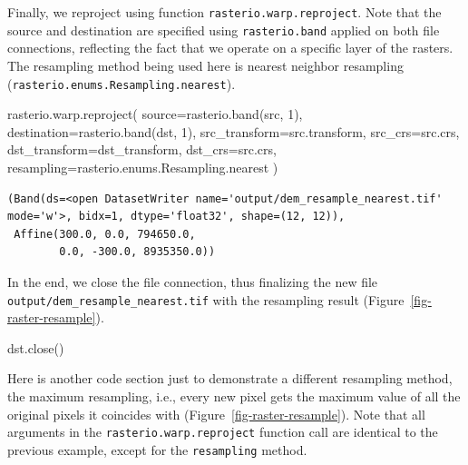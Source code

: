 \documentclass[
  letterpaper,
]{krantz}
\newenvironment{Shaded}{\begin{snugshade}}{\end{snugshade}}
\newcommand{\DecValTok}[1]{\textcolor[rgb]{0.68,0.00,0.00}{#1}}
\newcommand{\NormalTok}[1]{\textcolor[rgb]{0.00,0.23,0.31}{#1}}
\newcommand{\OperatorTok}[1]{\textcolor[rgb]{0.37,0.37,0.37}{#1}}
\begin{document}
Finally, we reproject using function \texttt{rasterio.warp.reproject}.
Note that the source and destination are specified using
\texttt{rasterio.band} applied on both file connections, reflecting the
fact that we operate on a specific layer of the rasters. The resampling
method being used here is nearest neighbor resampling
(\texttt{rasterio.enums.Resampling.nearest}).

\begin{Shaded}
\begin{Highlighting}[]
\NormalTok{rasterio.warp.reproject(}
\NormalTok{    source}\OperatorTok{=}\NormalTok{rasterio.band(src, }\DecValTok{1}\NormalTok{),}
\NormalTok{    destination}\OperatorTok{=}\NormalTok{rasterio.band(dst, }\DecValTok{1}\NormalTok{),}
\NormalTok{    src\_transform}\OperatorTok{=}\NormalTok{src.transform,}
\NormalTok{    src\_crs}\OperatorTok{=}\NormalTok{src.crs,}
\NormalTok{    dst\_transform}\OperatorTok{=}\NormalTok{dst\_transform,}
\NormalTok{    dst\_crs}\OperatorTok{=}\NormalTok{src.crs,}
\NormalTok{    resampling}\OperatorTok{=}\NormalTok{rasterio.enums.Resampling.nearest}
\NormalTok{)}
\end{Highlighting}
\end{Shaded}

\begin{verbatim}
(Band(ds=<open DatasetWriter name='output/dem_resample_nearest.tif' mode='w'>, bidx=1, dtype='float32', shape=(12, 12)),
 Affine(300.0, 0.0, 794650.0,
        0.0, -300.0, 8935350.0))
\end{verbatim}

In the end, we close the file connection, thus finalizing the new file
\texttt{output/dem\_resample\_nearest.tif} with the resampling result
(Figure~\ref{fig-raster-resample}).

\begin{Shaded}
\begin{Highlighting}[]
\NormalTok{dst.close()}
\end{Highlighting}
\end{Shaded}

Here is another code section just to demonstrate a different resampling
method, the maximum resampling, i.e., every new pixel gets the maximum
value of all the original pixels it coincides with
(Figure~\ref{fig-raster-resample}). Note that all arguments in the
\texttt{rasterio.warp.reproject} function call are identical to the
previous example, except for the \texttt{resampling} method.
\end{document}
